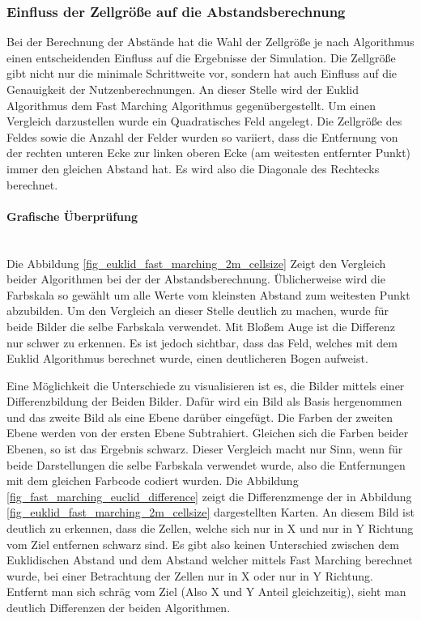 \subsubsection{Einfluss der Zellgröße auf die Abstandsberechnung}
Bei der Berechnung der Abstände hat die Wahl der Zellgröße je nach Algorithmus einen entscheidenden Einfluss auf die Ergebnisse der Simulation. Die Zellgröße gibt nicht nur die minimale Schrittweite vor, sondern hat auch Einfluss auf die Genauigkeit der Nutzenberechnungen. An dieser Stelle wird der Euklid Algorithmus dem Fast Marching Algorithmus gegenübergestellt. Um einen Vergleich darzustellen wurde ein Quadratisches Feld angelegt. Die Zellgröße des Feldes sowie die Anzahl der Felder wurden so variiert, dass die Entfernung von der rechten unteren Ecke zur linken oberen Ecke (am weitesten entfernter Punkt) immer den gleichen Abstand hat. Es wird also die Diagonale des Rechtecks berechnet. 

\paragraph{Grafische Überprüfung}\\
Die Abbildung \ref{fig_euklid_fast_marching_2m_cellsize} Zeigt den Vergleich beider Algorithmen bei der der Abstandsberechnung. Üblicherweise wird die Farbskala so gewählt um alle Werte vom kleinsten Abstand zum weitesten Punkt abzubilden. Um den Vergleich an dieser Stelle deutlich zu machen, wurde für beide Bilder die selbe Farbskala verwendet. Mit Bloßem Auge ist die Differenz nur schwer zu erkennen. Es ist jedoch sichtbar, dass das Feld, welches mit dem Euklid Algorithmus berechnet wurde, einen deutlicheren Bogen aufweist. 

Eine Möglichkeit die Unterschiede zu visualisieren ist es, die Bilder mittels einer Differenzbildung der Beiden Bilder. Dafür wird ein Bild als Basis hergenommen und das zweite Bild als eine Ebene darüber eingefügt. Die Farben der zweiten Ebene werden von der ersten Ebene Subtrahiert. Gleichen sich die Farben beider Ebenen, so ist das Ergebnis schwarz. Dieser Vergleich macht nur Sinn, wenn für beide Darstellungen die selbe Farbskala verwendet wurde, also die Entfernungen mit dem gleichen Farbcode codiert wurden. Die Abbildung \ref{fig_fast_marching_euclid_difference} zeigt die Differenzmenge der in Abbildung \ref{fig_euklid_fast_marching_2m_cellsize} dargestellten Karten.
An diesem Bild ist deutlich zu erkennen, dass die Zellen, welche sich nur in X und nur in Y Richtung vom Ziel entfernen schwarz sind.  Es gibt also keinen Unterschied zwischen dem Euklidischen Abstand und dem Abstand welcher mittels Fast Marching berechnet wurde, bei einer Betrachtung der Zellen nur in X oder nur in Y Richtung. Entfernt man sich schräg vom Ziel (Also X und Y Anteil gleichzeitig), sieht man deutlich Differenzen der beiden Algorithmen. 

